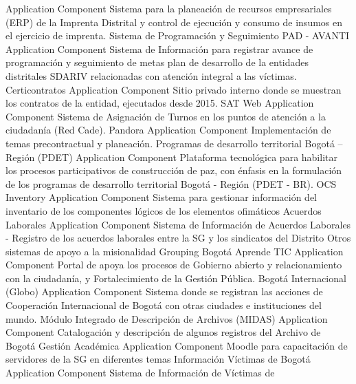 \documentclass[
	a4paper, %
	12pt, %
]{include/CSSullivanBusinessReport}
\begin{document}
Application Component \textbar{} Sistema para la planeación de recursos
empresariales (ERP) de la Imprenta Distrital y control de ejecución y
consumo de insumos en el ejercicio de imprenta. \textbar{} \textbar{}
Sistema de Programación y Seguimiento PAD - AVANTI \textbar{}
Application Component \textbar{} Sistema de Información para registrar
avance de programación y seguimiento de metas plan de desarrollo de la
entidades distritales SDARIV relacionadas con atención integral a las
víctimas. \textbar{} \textbar{} Certicontratos \textbar{} Application
Component \textbar{} Sitio privado interno donde se muestran los
contratos de la entidad, ejecutados desde 2015. \textbar{} \textbar{}
SAT Web \textbar{} Application Component \textbar{} Sistema de
Asignación de Turnos en los puntos de atención a la ciudadanía (Red
Cade). \textbar{} \textbar{} Pandora \textbar{} Application Component
\textbar{} Implementación de temas precontractual y planeación.
\textbar{} \textbar{} Programas de desarrollo territorial Bogotá --
Región (PDET) \textbar{} Application Component \textbar{} Plataforma
tecnológica para habilitar los procesos participativos de construcción
de paz, con énfasis en la formulación de los programas de desarrollo
territorial Bogotá - Región (PDET - BR). \textbar{} \textbar{} OCS
Inventory \textbar{} Application Component \textbar{} Sistema para
gestionar información del inventario de los componentes lógicos de los
elementos ofimáticos \textbar{} \textbar{} Acuerdos Laborales \textbar{}
Application Component \textbar{} Sistema de Información de Acuerdos
Laborales - Registro de los acuerdos laborales entre la SG y los
sindicatos del Distrito \textbar{} \textbar{} Otros sistemas de apoyo a
la misionalidad \textbar{} Grouping \textbar{} \textbar{} \textbar{}
Bogotá Aprende TIC \textbar{} Application Component \textbar{} Portal de
apoya los procesos de Gobierno abierto y relacionamiento con la
ciudadanía, y Fortalecimiento de la Gestión Pública. \textbar{}
\textbar{} Bogotá Internacional (Globo) \textbar{} Application Component
\textbar{} Sistema donde se registran las acciones de Cooperación
Internacional de Bogotá con otras ciudades e instituciones del mundo.
\textbar{} \textbar{} Módulo Integrado de Descripción de Archivos
(MIDAS) \textbar{} Application Component \textbar{} Catalogación y
descripción de algunos registros del Archivo de Bogotá \textbar{}
\textbar{} Gestión Académica \textbar{} Application Component \textbar{}
Moodle para capacitación de servidores de la SG en diferentes temas
\textbar{} \textbar{} Información Víctimas de Bogotá \textbar{}
Application Component \textbar{} Sistema de Información de Víctimas de
\end{document}
